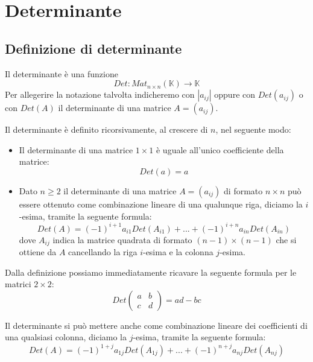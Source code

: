 \chapter{Determinante}
\section{Definizione di determinante}
Il determinante \`e una funzione
\begin{equation*}
	Det : Mat_{n \times n}(\mathbb{K}) \to \mathbb{K}
\end{equation*}
Per allegerire la notazione talvolta indicheremo con $|a_{ij}|$ oppure con
$Det(a_{ij})$ o con $Det(A)$ il determinante di una matrice $A = (a_{ij})$.

Il determinante \`e definito ricorsivamente, al crescere di $n$, nel seguente
modo:
\begin{itemize}
	\item Il determinante di una matrice $1 \times 1$ \`e uguale all'unico
	      coefficiente della matrice:
	      \begin{equation*}
		      Det(a) = a
	      \end{equation*}
	\item Dato $n \geq 2$ il determinante di una matrice $A = (a_{ij})$ di
	      formato $n \times n$ pu\`o essere ottenuto come combinazione lineare
	      di una qualunque riga, diciamo la $i$-esima, tramite la seguente
	      formula:
	      \begin{equation*}
		      Det(A) = (-1)^{i + 1}a_{i1}Det(A_{i1}) + ... +
		      (-1)^{i + n}a_{in}Det(A_{in})
	      \end{equation*}
	      dove $A_{ij}$ indica la matrice quadrata di formato
	      $(n - 1) \times (n - 1)$ che si ottiene da $A$ cancellando la riga
	      $i$-esima e la colonna $j$-esima.
\end{itemize}

\begin{observation}
	Dalla definizione possiamo immediatamente ricavare la seguente formula
	per le matrici $2 \times 2$:
	\begin{equation*}
		Det \begin{pmatrix}
			a & b \\
			c & d
		\end{pmatrix} =
		ad - bc
	\end{equation*}
\end{observation}

\begin{observation}
	Il determinante si pu\`o mettere anche come combinazione lineare dei
	coefficienti di una qualsiasi colonna, diciamo la $j$-esima, tramite
	la seguente formula:
	\begin{equation*}
		Det(A) = (-1)^{1 + j}a_{1j}Det(A_{1j}) + ... +
		(-1)^{n + j}a_{nj}Det(A_{nj})
	\end{equation*}
\end{observation}

